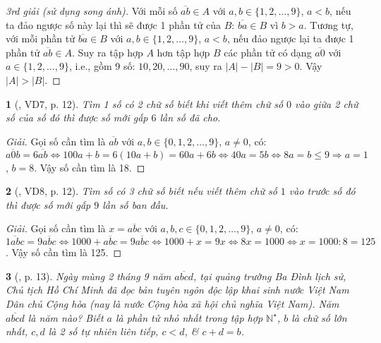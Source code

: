 \documentclass{article}
\newtheorem{baitoan}{}
\begin{document}
\begin{proof}[3rd giải (sử dụng song ánh)]
	Với mỗi số $\overline{ab}\in A$ với $a,b\in\{1,2,\ldots,9\}$, $a < b$, nếu ta đảo ngược số này lại thì sẽ được 1 phần tử của $B$: $\overline{ba}\in B$ vì $b > a$. Tương tự, với mỗi phần tử $\overline{ba}\in B$ với $a,b\in\{1,2,\ldots,9\}$, $a < b$, nếu đảo ngược lại ta được 1 phần tử $\overline{ab}\in A$. Suy ra tập hợp $A$ hơn tập hợp $B$ các phần tử có dạng $\overline{a0}$ với $a\in\{1,2,\ldots,9\}$, i.e., gồm 9 số: $10,20,\ldots,90$, suy ra $|A| - |B| = 9 > 0$. Vậy $|A| > |B|$.
\end{proof}

\begin{baitoan}[\cite{Binh_boi_duong_Toan_6_tap_1}, VD7, p. 12]
	Tìm 1 số có 2 chữ số biết khi viết thêm chữ số $0$ vào giữa 2 chữ số của số đó thì được số mới gấp $6$ lần số đã cho.
\end{baitoan}

\begin{proof}[Giải]
	Gọi số cần tìm là $\overline{ab}$ với $a,b\in\{0,1,2,\ldots,9\}$, $a\ne0$, có: $\overline{a0b} = 6\overline{ab}\Leftrightarrow100a + b = 6(10a + b) = 60a + 6b\Leftrightarrow40a = 5b\Leftrightarrow8a = b\le9\Rightarrow a = 1$, $b = 8$. Vậy số cần tìm là 18.
\end{proof}

\begin{baitoan}[\cite{Binh_boi_duong_Toan_6_tap_1}, VD8, p. 12]
	Tìm số có 3 chữ số biết nếu viết thêm chữ số $1$ vào trước số đó thì được số mới gấp $9$ lần số ban đầu.	
\end{baitoan}

\begin{proof}[Giải]
	Gọi số cần tìm là $x = \overline{abc}$ với $a,b,c\in\{0,1,2,\ldots,9\}$, $a\ne0$, có: $\overline{1abc} = 9\overline{abc}\Leftrightarrow1000 + \overline{abc} = 9\overline{abc}\Leftrightarrow1000 + x = 9x\Leftrightarrow8x = 1000\Leftrightarrow x = 1000:8 = 125$. Vậy số cần tìm là 125.
\end{proof}

\begin{baitoan}[\cite{Binh_boi_duong_Toan_6_tap_1}, p. 13]
	Ngày mùng 2 tháng 9 năm $\overline{abcd}$, tại quảng trường Ba Đình lịch sử, Chủ tịch Hồ Chí Minh đã đọc bản tuyên ngôn độc lập khai sinh nước Việt Nam Dân chủ Cộng hòa (nay là nước Cộng hòa xã hội chủ nghĩa Việt Nam). Năm $\overline{abcd}$ là năm nào? Biết $a$ là phần tử nhỏ nhất trong tập hợp $ \mathbb{N}^\star$, $b$ là chữ số lớn nhất, $c,d$ là 2 số tự nhiên liên tiếp, $c < d$, \& $c + d = b$.
\end{baitoan}
\end{document}
